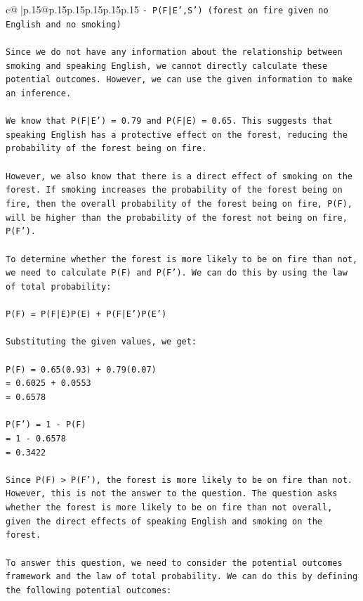 \documentclass{article}
\begin{document}
{\begin{supertabular}{c@{$\;$}|p{.15\linewidth}@{}p{.15\linewidth}p{.15\linewidth}p{.15\linewidth}p{.15\linewidth}p{.15\linewidth}}
{{{\texttt{{-} P(F|E',S') (forest on fire given no English and no smoking)} \\
\\ 
\texttt{Since we do not have any information about the relationship between smoking and speaking English, we cannot directly calculate these potential outcomes. However, we can use the given information to make an inference.} \\
\\ 
\texttt{We know that P(F|E') = 0.79 and P(F|E) = 0.65. This suggests that speaking English has a protective effect on the forest, reducing the probability of the forest being on fire.} \\
\\ 
\texttt{However, we also know that there is a direct effect of smoking on the forest. If smoking increases the probability of the forest being on fire, then the overall probability of the forest being on fire, P(F), will be higher than the probability of the forest not being on fire, P(F').} \\
\\ 
\texttt{To determine whether the forest is more likely to be on fire than not, we need to calculate P(F) and P(F'). We can do this by using the law of total probability:} \\
\\ 
\texttt{P(F) = P(F|E)P(E) + P(F|E')P(E')} \\
\\ 
\texttt{Substituting the given values, we get:} \\
\\ 
\texttt{P(F) = 0.65(0.93) + 0.79(0.07)} \\
\texttt{= 0.6025 + 0.0553} \\
\texttt{= 0.6578} \\
\\ 
\texttt{P(F') = 1 {-} P(F)} \\
\texttt{= 1 {-} 0.6578} \\
\texttt{= 0.3422} \\
\\ 
\texttt{Since P(F) > P(F'), the forest is more likely to be on fire than not. However, this is not the answer to the question. The question asks whether the forest is more likely to be on fire than not overall, given the direct effects of speaking English and smoking on the forest.} \\
\\ 
\texttt{To answer this question, we need to consider the potential outcomes framework and the law of total probability. We can do this by defining the following potential outcomes:} \\
}}}
\end{supertabular}}
\end{document}
